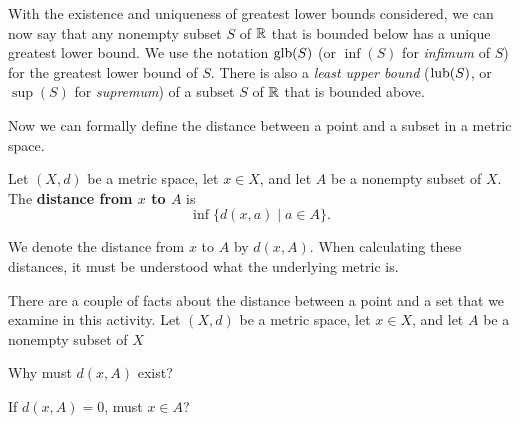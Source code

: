 With the existence and uniqueness of greatest lower bounds considered, we can now say that any nonempty subset $S$ of $\mathbb{R}$ that is bounded below has a unique greatest lower bound. We use the notation $\text{glb}(S)$ (or $\inf(S)$ for \emph{infimum} of $S$) for the greatest lower bound of $S$. There is also a \emph{least upper bound} ($\text{lub}(S)$, or $\sup(S)$ for \emph{supremum}) of a subset $S$ of $\mathbb{R}$ that is bounded above. 

Now we can formally define the distance between a point and a subset in a metric space.
 
\begin{definition} Let $(X,d)$ be a metric space, let $x \in X$, and let $A$ be a nonempty subset of $X$. The \textbf{distance from $x$ to $A$} is
\[\inf\{d(x,a) \mid a \in A\}.\]
\end{definition}

We denote the distance from $x$ to $A$ by $d(x,A)$. When calculating these distances, it must be understood what the underlying metric is. 

\begin{activity} There are a couple of facts about the distance between a point and a set that we examine in this activity. Let $(X,d)$ be a metric space, let $x \in X$, and let $A$ be a nonempty subset of $X$
\ba
\item Why must $d(x,A)$ exist?  

\item If $d(x,A) = 0$, must $x \in A$? 

\ea

\end{activity}

\begin{comment}

\ActivitySolution

\ba
\item Since $d(x,y) \geq 0$, the set $\{d(x,a) \mid a \in A\}$ is bounded below by $0$. Since $A$ is not empty, the set $\{d(x,a) \mid a \in A\}$ is also not empty. So $\inf\{d(x,a) \mid a \in A\}$ exists. 

\item The answer is no. Let $A = (0,1)$ in $\R$ using the Euclidean metric. Then $d(1,A) = 0$, but $1 \notin A$. 

\ea

\end{comment}



